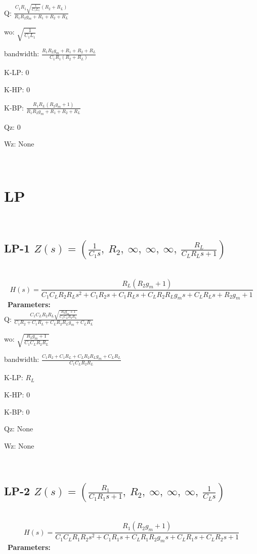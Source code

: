 \documentclass{article}
\begin{document}
Q: $\frac{C_{1} R_{1} \sqrt{\frac{1}{C_{1} L_{1}}} \left(R_{2} + R_{L}\right)}{R_{1} R_{2} g_{m} + R_{1} + R_{2} + R_{L}}$\ 

wo: $\sqrt{\frac{1}{C_{1} L_{1}}}$\ 

bandwidth: $\frac{R_{1} R_{2} g_{m} + R_{1} + R_{2} + R_{L}}{C_{1} R_{1} \left(R_{2} + R_{L}\right)}$\ 

K-LP: $0$\ 

K-HP: $0$\ 

K-BP: $\frac{R_{1} R_{L} \left(R_{2} g_{m} + 1\right)}{R_{1} R_{2} g_{m} + R_{1} + R_{2} + R_{L}}$\ 

Qz: $0$\ 

Wz: $\text{None}$\ 

\ 

\section{LP}\ 
\subsection{LP-1 $Z(s) = \left( \frac{1}{C_{1} s}, \  R_{2}, \  \infty, \  \infty, \  \infty, \  \frac{R_{L}}{C_{L} R_{L} s + 1}\right)$ } \ 
\textbf{\[H(s) = \frac{R_{L} \left(R_{2} g_{m} + 1\right)}{C_{1} C_{L} R_{2} R_{L} s^{2} + C_{1} R_{2} s + C_{1} R_{L} s + C_{L} R_{2} R_{L} g_{m} s + C_{L} R_{L} s + R_{2} g_{m} + 1}\] } \ 
\textbf{Parameters:}\\ 

Q: $\frac{C_{1} C_{L} R_{2} R_{L} \sqrt{\frac{R_{2} g_{m} + 1}{C_{1} C_{L} R_{2} R_{L}}}}{C_{1} R_{2} + C_{1} R_{L} + C_{L} R_{2} R_{L} g_{m} + C_{L} R_{L}}$\ 

wo: $\sqrt{\frac{R_{2} g_{m} + 1}{C_{1} C_{L} R_{2} R_{L}}}$\ 

bandwidth: $\frac{C_{1} R_{2} + C_{1} R_{L} + C_{L} R_{2} R_{L} g_{m} + C_{L} R_{L}}{C_{1} C_{L} R_{2} R_{L}}$\ 

K-LP: $R_{L}$\ 

K-HP: $0$\ 

K-BP: $0$\ 

Qz: $\text{None}$\ 

Wz: $\text{None}$\ 

\ 

\subsection{LP-2 $Z(s) = \left( \frac{R_{1}}{C_{1} R_{1} s + 1}, \  R_{2}, \  \infty, \  \infty, \  \infty, \  \frac{1}{C_{L} s}\right)$ } \ 
\textbf{\[H(s) = \frac{R_{1} \left(R_{2} g_{m} + 1\right)}{C_{1} C_{L} R_{1} R_{2} s^{2} + C_{1} R_{1} s + C_{L} R_{1} R_{2} g_{m} s + C_{L} R_{1} s + C_{L} R_{2} s + 1}\] } \ 
\textbf{Parameters:}\\ 
\end{document}
